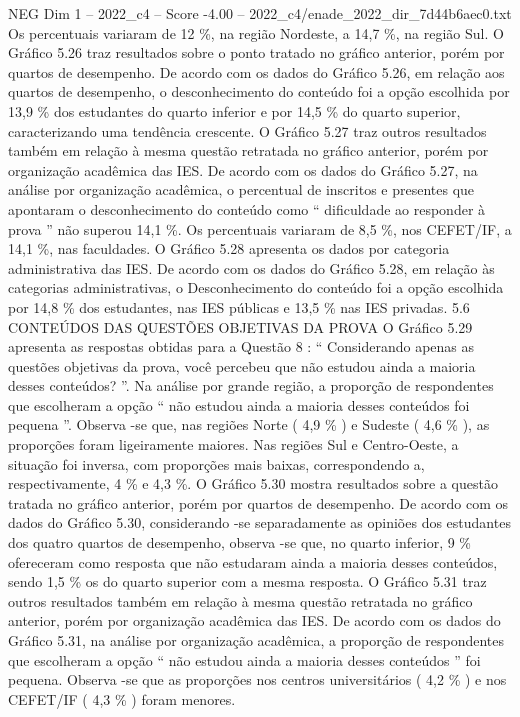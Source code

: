 \begin{textsample}{NEG Dim 1 – 2022\_c4 – Score -4.00 – 2022\_c4/enade\_2022\_dir\_7d44b6aec0.txt}
Os percentuais variaram de 12 \%, na região Nordeste, a 14,7 \%, na região Sul.
O Gráfico 5.26 traz resultados sobre o ponto tratado no gráfico anterior, porém por quartos de desempenho.
De acordo com os dados do Gráfico 5.26, em relação aos quartos de desempenho, o desconhecimento do conteúdo foi a opção escolhida por 13,9 \% dos estudantes do quarto inferior e por 14,5 \% do quarto superior, caracterizando uma tendência crescente.
O Gráfico 5.27 traz outros resultados também em relação à mesma questão retratada no gráfico anterior, porém por organização acadêmica das IES.
De acordo com os dados do Gráfico 5.27, na análise por organização acadêmica, o percentual de inscritos e presentes que apontaram o desconhecimento do conteúdo como “ dificuldade ao responder à prova ” não superou 14,1 \%.
Os percentuais variaram de 8,5 \%, nos CEFET/IF, a 14,1 \%, nas faculdades.
O Gráfico 5.28 apresenta os dados por categoria administrativa das IES.
De acordo com os dados do Gráfico 5.28, em relação às categorias administrativas, o Desconhecimento do conteúdo foi a opção escolhida por 14,8 \% dos estudantes, nas IES públicas e 13,5 \% nas IES privadas. 5.6 CONTEÚDOS DAS QUESTÕES OBJETIVAS DA PROVA O Gráfico 5.29 apresenta as respostas obtidas para a Questão 8 : “ Considerando apenas as questões objetivas da prova, você percebeu que não estudou ainda a maioria desses conteúdos? ”.
Na análise por grande região, a proporção de respondentes que escolheram a opção “ não estudou ainda a maioria desses conteúdos foi pequena ”.
Observa -se que, nas regiões Norte ( 4,9 \% ) e Sudeste ( 4,6 \% ), as proporções foram ligeiramente maiores.
Nas regiões Sul e Centro-Oeste, a situação foi inversa, com proporções mais baixas, correspondendo a, respectivamente, 4 \% e 4,3 \%.
O Gráfico 5.30 mostra resultados sobre a questão tratada no gráfico anterior, porém por quartos de desempenho.
De acordo com os dados do Gráfico 5.30, considerando -se separadamente as opiniões dos estudantes dos quatro quartos de desempenho, observa -se que, no quarto inferior, 9 \% ofereceram como resposta que não estudaram ainda a maioria desses conteúdos, sendo 1,5 \% os do quarto superior com a mesma resposta.
O Gráfico 5.31 traz outros resultados também em relação à mesma questão retratada no gráfico anterior, porém por organização acadêmica das IES.
De acordo com os dados do Gráfico 5.31, na análise por organização acadêmica, a proporção de respondentes que escolheram a opção “ não estudou ainda a maioria desses conteúdos ” foi pequena.
Observa -se que as proporções nos centros universitários ( 4,2 \% ) e nos CEFET/IF ( 4,3 \% ) foram menores.

\end{textsample}
